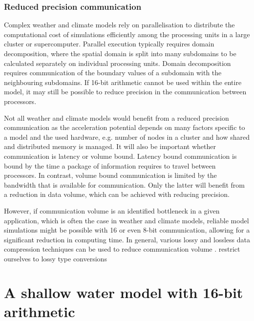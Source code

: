 \documentclass[draft]{agujournal2019}
\begin{document}
\subsubsection{Reduced precision communication}

Complex weather and climate models rely on parallelisation to distribute the
computational cost of simulations efficiently among the processing units in a
large cluster or supercomputer. Parallel execution typically requires domain
decomposition, where the spatial domain is split into many subdomains to be
calculated separately on individual processing units. Domain decomposition
requires communication of the boundary values of a subdomain with the
neighbouring subdomains. If 16-bit arithmetic cannot be used within the
entire model, it may still be possible to reduce precision in the communication
between processors.

Not all weather and climate models would benefit from a reduced precision
communication as the acceleration potential depends on many factors specific
to a model and the used hardware, e.g. number of nodes in a cluster and how
shared and distributed memory is managed. It will also be important
whether communication is latency or volume bound. Latency bound communication is
bound by the time a package of information requires to travel between processors.
In contrast, volume bound communication is limited by the bandwidth that is
available for communication. Only the latter will benefit from a reduction in data
volume, which can be achieved with reducing precision.

However, if communication volume is an identified bottleneck in a given application,
which is often the case in weather and climate models, reliable model simulations
might be possible with 16 or even 8-bit communication, allowing for a significant
reduction in computing time. In general, various lossy and lossless data compression
techniques can be used to reduce communication volume \cite{Fan2019}.  restrict ourselves to lossy type
conversions

\section{A shallow water model with 16-bit arithmetic}
\label{sec:swm}
\end{document}
